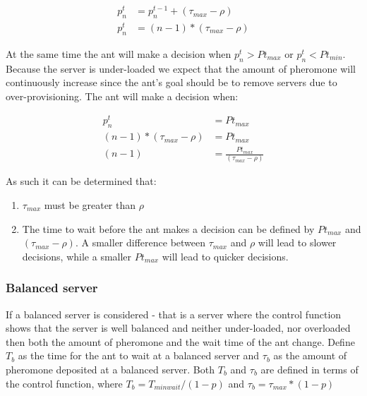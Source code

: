 \begin{equation}
\begin{aligned}
p^{t}_{n} &= p^{t-1}_{n} + (\tau_{max} - \rho) \\
p^{t}_{n} &= (n - 1) * (\tau_{max} - \rho)
\end{aligned}
\end{equation}

At the same time the ant will make a decision when $p^{t}_{n} > Pt_{max}$ or $p^{t}_{n} < Pt_{min}$. Because the server is under-loaded we expect that the amount of pheromone will continuously increase since the ant's goal should be to remove servers due to over-provisioning. The ant will make a decision when:

\begin{equation}
\begin{aligned}
p^{t}_{n} &= Pt_{max} \\
(n - 1) * (\tau_{max} - \rho) &= Pt_{max} \\
(n - 1) &= \frac{Pt_{max}}{(\tau_{max} - \rho)} 
\end{aligned}
\end{equation}

As such it can be determined that:

\begin{enumerate}
	\item $\tau_{max}$ must be greater than $\rho$
	\item The time to wait before the ant makes a decision can be defined by $Pt_{max}$ and $(\tau_{max} - \rho)$. A smaller difference between $\tau_{max}$ and $\rho$ will lead to slower decisions, while a smaller $Pt_{max}$ will lead to quicker decisions.
\end{enumerate}

\subsubsection{Balanced server}

If a balanced server is considered - that is a server where the control function shows that the server is well balanced and neither under-loaded, nor overloaded then both the amount of pheromone and the wait time of the ant change. Define $T_{b}$ as the time for the ant to wait at a balanced server and $\tau_{b}$ as the amount of pheromone deposited at a balanced server. Both $T_{b}$ and $\tau_{b}$ are defined in terms of the control function, where $T_{b} = T_{minwait} / (1 - p)$ and $\tau_{b} = \tau_{max} * (1 - p)$

